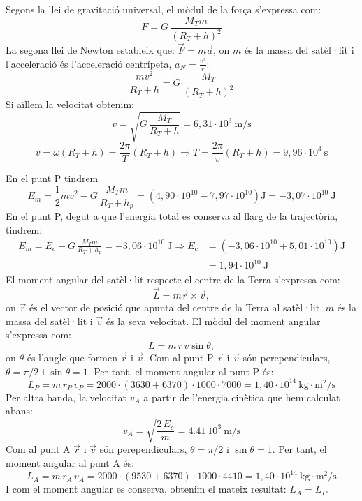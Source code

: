 \begin{solapartat}
Segons la llei de gravitació universal, el mòdul de la força s'expressa com:
\[ F = G\,\frac{M_Tm}{(R_T + h)^2} \]
La segona llei de Newton estableix que: $\vec{F} = m\vec{a}$, on $m$ és la massa del satèl·lit i l'acceleració és l'acceleració centrípeta, $a_N = \frac{v^2}{r}$:
\[ \frac{mv^2}{R_T + h} = G\,\frac{M_T}{(R_T + h)^2} \]
Si aïllem la velocitat obtenim:
\[ v = \sqrt{G\,\frac{M_T}{R_T + h}} = 6,31\cdot 10^{3}\ \mathrm{m/s} \]
\[ v = \omega(R_T + h) = \frac{2\pi}{T}(R_T + h) \Longrightarrow T = \frac{2\pi}{v}(R_T + h) = 9,96\cdot 10^{3}\ \mathrm{s} \]
\end{solapartat}

\begin{solapartat}
En el punt P tindrem
\[ E_m = \frac{1}{2}mv^2 - G\,\frac{M_Tm}{R_T + h_p} = \left(4,90\cdot 10^{10} - 7,97\cdot 10^{10}\right)\mathrm{J} = -3,07\cdot 10^{10}\ \mathrm{J} \]
En el punt P, degut a que l'energia total es conserva al llarg de la trajectòria, tindrem:
\begin{align*}
E_m = E_c - G\,\frac{M_Tm}{R_T + h_p} = -3,06\cdot 10^{10}\ \mathrm{J} \Longrightarrow E_c &= \left(-3,06\cdot 10^{10} + 5,01\cdot 10^{10}\right)\mathrm{J}\\
&= 1,94\cdot 10^{10}\ \mathrm{J}
\end{align*}
El moment angular del satèl·lit respecte el centre de la Terra s'expressa com:
\[ \vec{L} = m\vec{r}\times\vec{v}, \]
on $\vec{r}$ és el vector de posició que apunta del centre de la Terra al satèl·lit, $m$ és la massa del satèl·lit i $\vec{v}$ és la seva velocitat. El mòdul del moment angular s'expressa com:
\[ L = m\,r\,v\sin\theta, \]
on $\theta$ és l'angle que formen $\vec{r}$ i $\vec{v}$. Com al punt P $\vec{r}$ i $\vec{v}$ són perependiculars, $\theta = \pi/2$ i $\sin\theta = 1$. Per tant, el moment angular al punt P és:
\[ L_P = m\,r_P\,v_P = 2000\cdot(3630 + 6370)\cdot 1000\cdot 7000 = 1,40\cdot 10^{14}\ \mathrm{kg\cdot m^2/s} \]
Per altra banda, la velocitat $v_A$ a partir de l'energia cinètica que hem calculat abans:
\[ v_A = \sqrt{\frac{2\,E_c}{m}} = 4.41\ 10^{3}\ \mathrm{m/s} \]
Com al punt A $\vec{r}$ i $\vec{v}$ són perependiculars, $\theta = \pi/2$ i $\sin\theta = 1$. Per tant, el moment angular al punt A és:
\[ L_A = m\,r_A\,v_A = 2000\cdot(9530 + 6370)\cdot 1000\cdot 4410 = 1,40\cdot 10^{14}\ \mathrm{kg\cdot m^2/s} \]
I com el moment angular es conserva, obtenim el mateix resultat: $L_A = L_P$.
\end{solapartat}
